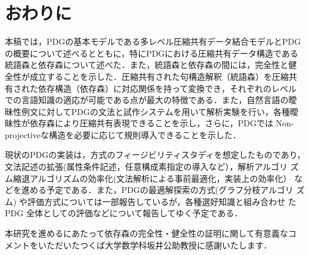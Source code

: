 \section{おわりに}

本稿では，PDGの基本モデルである多レベル圧縮共有データ結合モデルとPDG 
の概要について述べるとともに，特にPDGにおける圧縮共有データ構造である
統語森と依存森について述べた．また，統語森と依存森の間には，完全性と健
全性が成立することを示した．圧縮共有された句構造解釈（統語森）を圧縮共
有された依存構造（依存森）に対応関係を持って変換でき，それぞれのレベル
での言語知識の適応が可能である点が最大の特徴である．また，自然言語の曖
昧性例文に対してPDGの文法と試作システムを用いて解析実験を行い，各種曖
昧性が依存森により圧縮共有表現できることを示し，さらに，PDGでは
Non-projectiveな構造を必要に応じて規則導入できることを示した．

現状のPDGの実装は，方式のフィージビリティスタディを想定したものであり，
文法記述の拡張(属性条件記述，任意構成素指定の導入など），解析アルゴリ
ズム縮退アルゴリズムの効率化(文法解析による事前最適化，実装上の効率化）
などを進める予定である．また，PDGの最適解探索の方式(グラフ分枝アルゴリ
ズム) や評価方式については一部報告しているが，各種選好知識と組み合わせ
たPDG 全体としての評価などについて報告してゆく予定である．

\acknowledgment
本研究を進めるにあたって依存森の完全性・健全性の証明に関して有意義なコ
メントをいただいたつくば大学数学科坂井公助教授に感謝いたします．
\begin{comment}
また，様々なコメントをいただいた査読者の方々に感謝いたします．
\end{comment}

\newpage



